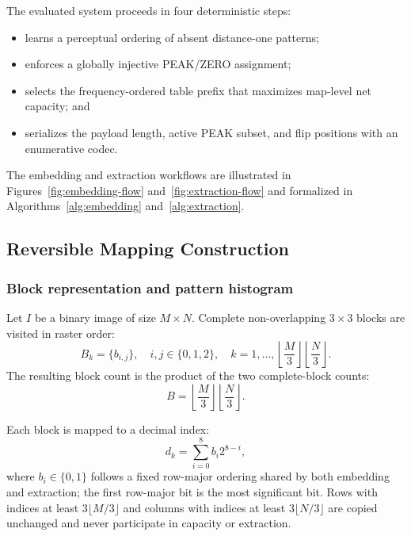 \documentclass[a4paper,fleqn]{cas-dc}
\newcommand{\RevisionAddBegin}{\begingroup}
\newcommand{\RevisionAddEnd}{\endgroup}
\newcommand{\RevisionAddBegin}{\begingroup\color{revisionblue}}
\newcommand{\RevisionAddEnd}{\endgroup}
\begin{document}
\RevisionAddBegin
The evaluated system proceeds in four deterministic steps:
\RevisionAddEnd
\begin{itemize}
    \item learns a perceptual ordering of absent distance-one patterns;
    \item enforces a globally injective PEAK/ZERO assignment;
\RevisionAddBegin
    \item selects the frequency-ordered table prefix that maximizes map-level
    net capacity; and
\RevisionAddEnd
    \item serializes the payload length, active PEAK subset, and flip positions
    with an enumerative codec.
\end{itemize}

The embedding and extraction workflows are illustrated in
Figures~\ref{fig:embedding-flow} and~\ref{fig:extraction-flow} and formalized
in Algorithms~\ref{alg:embedding} and~\ref{alg:extraction}.

\subsection{Reversible Mapping Construction}

\subsubsection*{Block representation and pattern histogram}

Let $I$ be a binary image of size $M\times N$. Complete non-overlapping
$3\times3$ blocks are visited in raster order:
\begin{equation}
B_k=\{b_{i,j}\},\quad i,j\in\{0,1,2\},\quad
k=1,\ldots,\left\lfloor\frac{M}{3}\right\rfloor
\left\lfloor\frac{N}{3}\right\rfloor .
\label{eq:block-index}
\end{equation}
The resulting block count is the product of the two complete-block counts:
\begin{equation}
B=\left\lfloor\frac{M}{3}\right\rfloor
  \left\lfloor\frac{N}{3}\right\rfloor .
\label{eq:block-count}
\end{equation}

Each block is mapped to a decimal index:
\begin{equation}
d_k = \sum_{i=0}^{8} b_i 2^{8-i},
\label{eq:pattern-index}
\end{equation}
where $b_i \in \{0,1\}$ follows a fixed row-major ordering shared by both
embedding and extraction; the first row-major bit is the most significant bit.
Rows with indices at least $3\lfloor M/3\rfloor$ and columns with indices at
least $3\lfloor N/3\rfloor$ are copied unchanged and never participate in
capacity or extraction.
\end{document}
